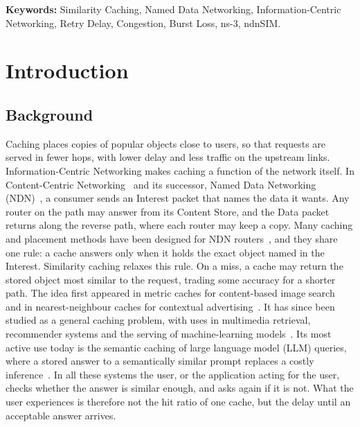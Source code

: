 \documentclass[11pt,a4paper]{article}
\begin{document}
\vspace{1em}
\noindent\textbf{Keywords:} Similarity Caching, Named Data Networking, Information-Centric
Networking, Retry Delay, Congestion, Burst Loss, ns-3, ndnSIM.

\newpage
{\setlength{\parskip}{0pt}\tableofcontents}
\newpage

\section{Introduction}\label{sec:intro}

\subsection{Background}
Caching places copies of popular objects close to users, so that requests are served in fewer hops,
with lower delay and less traffic on the upstream links. Information-Centric Networking makes
caching a function of the network itself. In Content-Centric Networking~\cite{jacobson2009ccn} and
its successor, Named Data Networking (NDN)~\cite{zhang2014ndn}, a consumer sends an Interest packet
that names the data it wants. Any router on the path may answer from its Content Store, and the Data
packet returns along the reverse path, where each router may keep a copy. Many caching and
placement methods have been designed for NDN routers~\cite{chaudhary2026ndncaching}, and they share
one rule: a cache answers only when it holds the exact object named in the Interest. Similarity
caching relaxes this rule. On a miss, a cache may return the stored object most similar to the
request, trading some accuracy for a shorter path. The idea first appeared in metric caches for
content-based image search~\cite{falchi2008metric} and in nearest-neighbour caches for contextual
advertising~\cite{pandey2009nn}. It has since been studied as a general caching problem, with uses
in multimedia retrieval, recommender systems and the serving of machine-learning
models~\cite{neglia2022similarity}. Its most active use today is the semantic caching of large
language model (LLM) queries, where a stored answer to a semantically similar prompt replaces a
costly inference~\cite{bang2023gptcache,gill2025meancache,schroeder2025vcache}. In all these
systems the user, or the application acting for the user, checks whether the answer is similar
enough, and asks again if it is not. What the user experiences is therefore not the hit ratio of
one cache, but the delay until an acceptable answer arrives.
\end{document}
